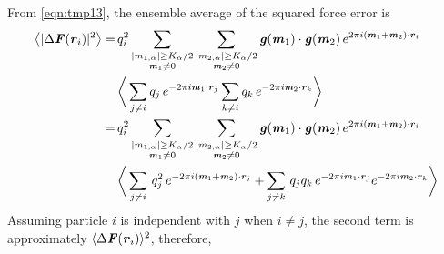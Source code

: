 \documentclass[aps,pre,preprint]{revtex4-1}
\renewcommand{\v}[1]{\textbf{\textit{#1}}}
\begin{document}
From \eqref{eqn:tmp13}, the ensemble average of the squared force error is
\begin{align}\nonumber
  \big\langle
  \vert\Delta\v F(\v r_i)\vert^2
  \big\rangle
  = \,&
  q^2_i
  \sum_{
    \begin{subarray}{c}
      \vert m_{1,\alpha}\vert \geq K_\alpha/2\\
      \v m_1\neq 0
    \end{subarray}}
  \sum_{
    \begin{subarray}{c}
      \vert m_{2,\alpha}\vert \geq K_\alpha/2\\
      \v m_2\neq 0
    \end{subarray}}
  \v g(\v m_1)\cdot\v g(\v m_2) \,
  e^{2\pi i(\v m_1 + \v m_2)\cdot\v r_i} \\ \nonumber
  &
  \bigg\langle
  \sum_{j\neq i}q_j\,e^{-2\pi i\v m_1\cdot\v r_j}  
  \sum_{k\neq i}q_k\,e^{-2\pi i\v m_2\cdot\v r_k}
  \bigg\rangle\\ \nonumber
  = \,&
  q^2_i
  \sum_{
    \begin{subarray}{c}
      \vert m_{1,\alpha}\vert \geq K_\alpha/2\\
      \v m_1\neq 0
    \end{subarray}}
  \sum_{
    \begin{subarray}{c}
      \vert m_{2,\alpha}\vert \geq K_\alpha/2\\
      \v m_2\neq 0
    \end{subarray}}
  \v g(\v m_1)\cdot\v g(\v m_2) \,
  e^{2\pi i(\v m_1 + \v m_2)\cdot\v r_i}\\\nonumber
  &
  \bigg\langle
  \sum_{j\neq i}\,q_j^2\,e^{-2\pi i(\v m_1 + \v m_2)\cdot\v r_j} +
  \sum_{j\neq k}\,q_jq_k\, e^{-2\pi i\v m_1\cdot\v r_j} e^{-2\pi i\v m_2\cdot\v r_k}
  \bigg\rangle
\end{align}
Assuming particle $i$ is independent with $j$ when $i\neq j$, the second term is
approximately $\langle\Delta\v F(\v r_i)\rangle^2$, therefore,
\end{document}
